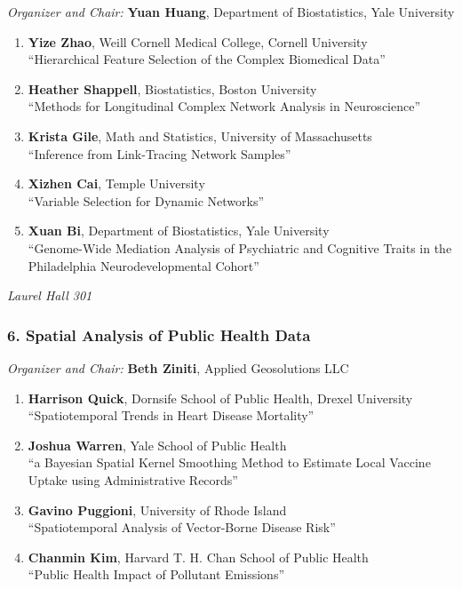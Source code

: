 \emph{Organizer and Chair:} \textbf{Yuan Huang}, Department of Biostatistics, Yale University

\begin{enumerate}
\item \textbf{Yize Zhao}, Weill Cornell Medical College, Cornell University \\
``Hierarchical Feature Selection of the Complex Biomedical Data''
\item \textbf{Heather Shappell}, Biostatistics, Boston University \\
``Methods for Longitudinal Complex Network Analysis in Neuroscience''
\item \textbf{Krista Gile}, Math and Statistics, University of Massachusetts \\
``Inference from Link-Tracing Network Samples''
\item \textbf{Xizhen Cai}, Temple University \\
``Variable Selection for Dynamic Networks''
\item \textbf{Xuan Bi}, Department of Biostatistics, Yale University \\
``Genome-Wide Mediation Analysis of Psychiatric and Cognitive Traits in the Philadelphia Neurodevelopmental Cohort''
\end{enumerate}

\emph{Laurel Hall 301} \\[.5em]

\subsubsection*{6. Spatial Analysis of Public Health Data}

\emph{Organizer and Chair:} \textbf{Beth Ziniti}, Applied Geosolutions LLC

\begin{enumerate}
\item \textbf{Harrison Quick}, Dornsife School of Public Health, Drexel University \\
``Spatiotemporal Trends in Heart Disease Mortality''
\item \textbf{Joshua Warren}, Yale School of Public Health \\
``a Bayesian Spatial Kernel Smoothing Method to Estimate Local Vaccine Uptake using Administrative Records''
\item \textbf{Gavino Puggioni}, University of Rhode Island \\
``Spatiotemporal Analysis of Vector-Borne Disease Risk''
\item \textbf{Chanmin Kim}, Harvard T. H. Chan School of Public Health \\
``Public Health Impact of Pollutant Emissions''
\end{enumerate}

